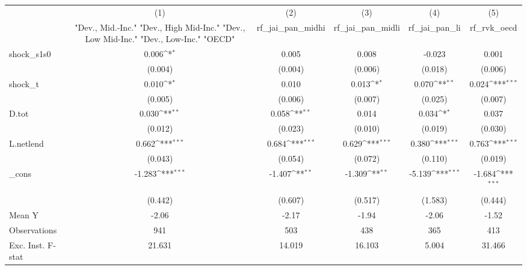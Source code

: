 {
\def\sym#1{\ifmmode^{#1}\else\(^{#1}\)\fi}
\begin{tabular}{l*{5}{c}}
\toprule
            &\multicolumn{1}{c}{(1)}&\multicolumn{1}{c}{(2)}&\multicolumn{1}{c}{(3)}&\multicolumn{1}{c}{(4)}&\multicolumn{1}{c}{(5)}\\
            &\multicolumn{1}{c}{ "Dev., Mid.-Inc." "Dev., High Mid-Inc." "Dev., Low Mid-Inc." "Dev., Low-Inc." "OECD" }&\multicolumn{1}{c}{rf\_jai\_pan\_midhi}&\multicolumn{1}{c}{rf\_jai\_pan\_midli}&\multicolumn{1}{c}{rf\_jai\_pan\_li}&\multicolumn{1}{c}{rf\_rvk\_oecd}\\
\midrule
shock\_s1s0  &       0.006\sym{*}  &       0.005         &       0.008         &      -0.023         &       0.001         \\
            &     (0.004)         &     (0.004)         &     (0.006)         &     (0.018)         &     (0.006)         \\
\addlinespace
shock\_t     &       0.010\sym{*}  &       0.010         &       0.013\sym{*}  &       0.070\sym{**} &       0.024\sym{***}\\
            &     (0.005)         &     (0.006)         &     (0.007)         &     (0.025)         &     (0.007)         \\
\addlinespace
D.tot       &       0.030\sym{**} &       0.058\sym{**} &       0.014         &       0.034\sym{*}  &       0.037         \\
            &     (0.012)         &     (0.023)         &     (0.010)         &     (0.019)         &     (0.030)         \\
\addlinespace
L.netlend   &       0.662\sym{***}&       0.684\sym{***}&       0.629\sym{***}&       0.380\sym{***}&       0.763\sym{***}\\
            &     (0.043)         &     (0.054)         &     (0.072)         &     (0.110)         &     (0.019)         \\
\addlinespace
\_cons      &      -1.283\sym{***}&      -1.407\sym{**} &      -1.309\sym{**} &      -5.139\sym{***}&      -1.684\sym{***}\\
            &     (0.442)         &     (0.607)         &     (0.517)         &     (1.583)         &     (0.444)         \\
\midrule
Mean Y      &       -2.06         &       -2.17         &       -1.94         &       -2.06         &       -1.52         \\
Observations&         941         &         503         &         438         &         365         &         413         \\
Exc. Inst. F-stat&      21.631         &      14.019         &      16.103         &       5.004         &      31.466         \\
\bottomrule
\end{tabular}
}
